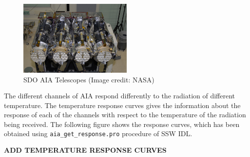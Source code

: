 \begin{figure}[h!]
    \centering
    \includegraphics[width=0.5\textwidth]{images/SDO AIA Telescopes.jpg}
    \caption{SDO AIA Telescopes (Image credit: NASA)}
    \label{fig:aia_telescopes}
\end{figure}

The different channels of AIA respond differently to the radiation of different temperature. The temperature response curves gives the information about the response of each of the channels with respect to the temperature of the radiation being received. The following figure shows the response curves, which has been obtained using \texttt{aia\_get\_response.pro} procedure of SSW IDL.

\textbf{ADD TEMPERATURE RESPONSE CURVES}

